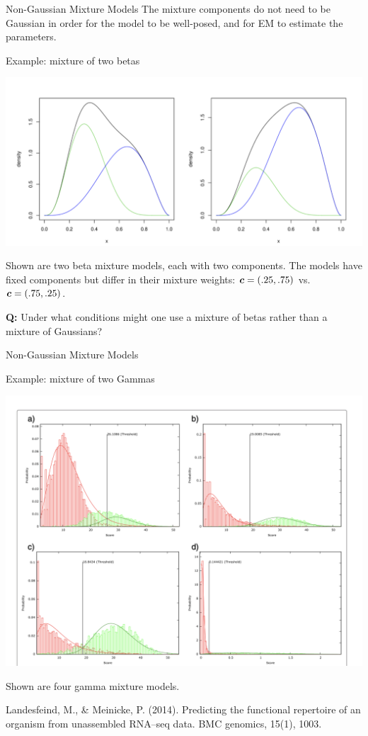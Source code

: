 \documentclass[10pt]{beamer}
\begin{document}
\begin{frame}{Non-Gaussian Mixture Models}
The mixture components do not need to be Gaussian in order for the model to be well-posed, and for EM to estimate the parameters.   \\
\vfill 
\begin{sblock}{Example: mixture of two betas}
\begin{center}
\includegraphics[width=.6\textwidth]{images/mixture_of_betas}

\end{center}
\scriptsize Shown are two beta mixture models, each with two components.  The models have fixed components but differ in their mixture weights: ${\boldsymbol c} = (.25, .75)$ vs. ${\boldsymbol c} = (.75, .25)$.
\end{sblock}

\vfill \vfill \vfill
\tiny \textbf{Q:} Under what conditions might one use a mixture of betas rather than a mixture of Gaussians?
\end{frame}

\begin{frame}{Non-Gaussian Mixture Models}

\begin{sblock}{Example: mixture of two Gammas}
\begin{center}
\includegraphics[width=.6\textwidth]{images/mixture_of_two_gammas}
\end{center}
\scriptsize Shown are four gamma mixture models.
\end{sblock}

\vfill \vfill \tiny Landesfeind, M., \& Meinicke, P. (2014). Predicting the functional repertoire of an organism from unassembled RNA–seq data. BMC genomics, 15(1), 1003.

\end{frame}
\end{document}
